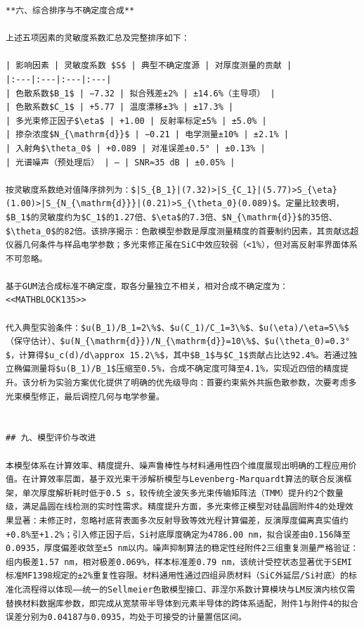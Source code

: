 \documentclass{mcmthesis}
\begin{document}
\begin{table}[htbp]
\begin{lstlisting}
**六、综合排序与不确定度合成**

上述五项因素的灵敏度系数汇总及完整排序如下：

| 影响因素 | 灵敏度系数 $S$ | 典型不确定度源 | 对厚度测量的贡献 |
|:---|:---|:---|:---|
| 色散系数$B_1$ | −7.32 | 拟合残差±2% | ±14.6%（主导项） |
| 色散系数$C_1$ | +5.77 | 温度漂移±3% | ±17.3% |
| 多光束修正因子$\eta$ | +1.00 | 反射率标定±5% | ±5.0% |
| 掺杂浓度$N_{\mathrm{d}}$ | −0.21 | 电学测量±10% | ±2.1% |
| 入射角$\theta_0$ | +0.089 | 对准误差±0.5° | ±0.13% |
| 光谱噪声（预处理后） | — | SNR≈35 dB | ±0.05% |

按灵敏度系数绝对值降序排列为：$|S_{B_1}|(7.32)>|S_{C_1}|(5.77)>S_{\eta}(1.00)>|S_{N_{\mathrm{d}}}|(0.21)>S_{\theta_0}(0.089)$。定量比较表明，$B_1$的灵敏度约为$C_1$的1.27倍、$\eta$的7.3倍、$N_{\mathrm{d}}$的35倍、$\theta_0$的82倍。该排序揭示：色散模型参数是厚度测量精度的首要制约因素，其贡献远超仪器几何条件与样品电学参数；多光束修正虽在SiC中效应较弱（<1%），但对高反射率界面体系不可忽略。

基于GUM法合成标准不确定度，取各分量独立不相关，相对合成不确定度为：
<<MATHBLOCK135>>

代入典型实验条件：$u(B_1)/B_1=2\%$、$u(C_1)/C_1=3\%$、$u(\eta)/\eta=5\%$（保守估计）、$u(N_{\mathrm{d}})/N_{\mathrm{d}}=10\%$、$u(\theta_0)=0.3°$，计算得$u_c(d)/d\approx 15.2\%$，其中$B_1$与$C_1$贡献占比达92.4%。若通过独立椭偏测量将$u(B_1)/B_1$压缩至0.5%，合成不确定度可降至4.1%，实现近四倍的精度提升。该分析为实验方案优化提供了明确的优先级导向：首要约束紫外共振色散参数，次要考虑多光束模型修正，最后调控几何与电学参量。


## 九、模型评价与改进

本模型体系在计算效率、精度提升、噪声鲁棒性与材料通用性四个维度展现出明确的工程应用价值。在计算效率层面，基于双光束干涉解析模型与Levenberg-Marquardt算法的联合反演框架，单次厚度解析耗时低于0.5 s，较传统全波矢多光束传输矩阵法（TMM）提升约2个数量级，满足晶圆在线检测的实时性需求。精度提升方面，多光束修正模型对硅晶圆附件4的处理效果显著：未修正时，忽略衬底背表面多次反射导致等效光程计算偏差，反演厚度偏离真实值约+0.8%至+1.2%；引入修正因子后，Si衬底厚度确定为4786.00 nm，拟合误差由0.156降至0.0935，厚度偏差收敛至±5 nm以内。噪声抑制算法的稳定性经附件2三组重复测量严格验证：组内极差1.57 nm，相对极差0.069%，样本标准差0.79 nm，该统计受控状态显著优于SEMI标准MF1398规定的±2%重复性容限。材料通用性通过四组异质材料（SiC外延层/Si衬底）的标准化流程得以体现——统一的Sellmeier色散模型接口、菲涅尔系数计算模块与LM反演内核仅需替换材料数据库参数，即完成从宽禁带半导体到元素半导体的跨体系适配，附件1与附件4的拟合误差分别为0.04187与0.0935，均处于可接受的计量置信区间。


\end{lstlisting}
\end{table}
\end{document}
